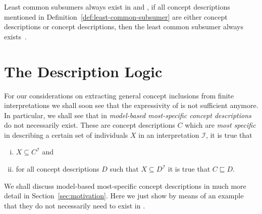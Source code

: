 Least common subsumers always exist in \EL and \ELbot, \ie if all concept descriptions
mentioned in Definition~\ref{def:least-common-subsumer} are either \EL concept
descriptions or \ELbot concept descriptions, then the least common subsumer always
exists~\cite{conf/ijcai/BaaderKM99}.

\section{The Description Logic \ELgfpbot}
\label{sec:descr-logics-elbot}

For our considerations on extracting general concept inclusions from finite
interpretations we shall soon see that the expressivity of \ELbot is not sufficient
anymore.  In particular, we shall see that in \ELbot \emph{model-based most-specific
  concept descriptions} do not necessarily exist.  These are concept descriptions $C$
which are \emph{most specific} in describing a certain set of individuals $X$ in an
interpretation $\mathcal{I}$, \ie it is true that
\begin{enumerate}[i. ]
\item $X \subseteq C^{\mathcal{I}}$ and
\item for all concept descriptions $D$ such that $X \subseteq D^{\mathcal{I}}$ it is true
  that $C \sqsubseteq D$.
\end{enumerate}
We shall discuss model-based most-specific concept descriptions in much more detail in
Section~\ref{sec:motivation}.  Here we just show by means of an example that they do not
necessarily need to exist in \ELbot.


